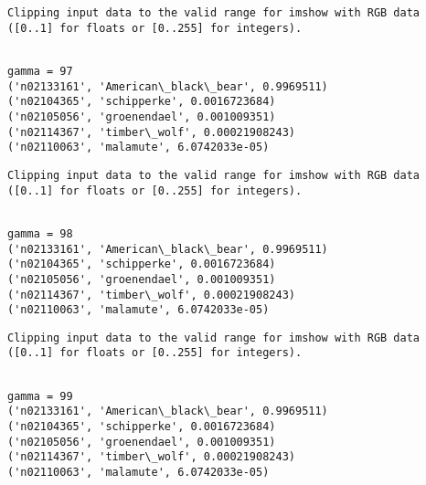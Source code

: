 \documentclass[11pt]{article}
\begin{document}
    \begin{Verbatim}[commandchars=\\\{\}]
Clipping input data to the valid range for imshow with RGB data ([0..1] for floats or [0..255] for integers).

    \end{Verbatim}

    \begin{Verbatim}[commandchars=\\\{\}]

gamma = 97
('n02133161', 'American\_black\_bear', 0.9969511)
('n02104365', 'schipperke', 0.0016723684)
('n02105056', 'groenendael', 0.001009351)
('n02114367', 'timber\_wolf', 0.00021908243)
('n02110063', 'malamute', 6.0742033e-05)

    \end{Verbatim}

    \begin{Verbatim}[commandchars=\\\{\}]
Clipping input data to the valid range for imshow with RGB data ([0..1] for floats or [0..255] for integers).

    \end{Verbatim}

    \begin{Verbatim}[commandchars=\\\{\}]

gamma = 98
('n02133161', 'American\_black\_bear', 0.9969511)
('n02104365', 'schipperke', 0.0016723684)
('n02105056', 'groenendael', 0.001009351)
('n02114367', 'timber\_wolf', 0.00021908243)
('n02110063', 'malamute', 6.0742033e-05)

    \end{Verbatim}

    \begin{Verbatim}[commandchars=\\\{\}]
Clipping input data to the valid range for imshow with RGB data ([0..1] for floats or [0..255] for integers).

    \end{Verbatim}

    \begin{Verbatim}[commandchars=\\\{\}]

gamma = 99
('n02133161', 'American\_black\_bear', 0.9969511)
('n02104365', 'schipperke', 0.0016723684)
('n02105056', 'groenendael', 0.001009351)
('n02114367', 'timber\_wolf', 0.00021908243)
('n02110063', 'malamute', 6.0742033e-05)

    \end{Verbatim}
\end{document}
